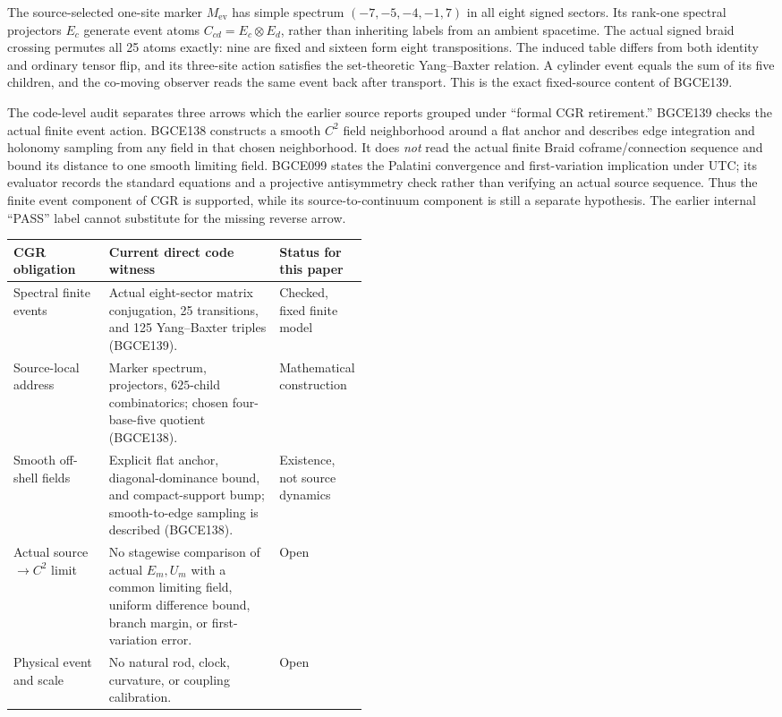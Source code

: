 \documentclass[11pt]{article}
\theoremstyle{definition}
\theoremstyle{remark}
\begin{document}
The source-selected one-site marker $M_{\mathrm{ev}}$ has simple spectrum $(-7,-5,-4,-1,7)$ in all eight signed sectors. Its rank-one spectral projectors $E_c$ generate event atoms $C_{cd}=E_c\otimes E_d$, rather than inheriting labels from an ambient spacetime. The actual signed braid crossing permutes all 25 atoms exactly: nine are fixed and sixteen form eight transpositions. The induced table differs from both identity and ordinary tensor flip, and its three-site action satisfies the set-theoretic Yang--Baxter relation. A cylinder event equals the sum of its five children, and the co-moving observer reads the same event back after transport. This is the exact fixed-source content of BGCE139.

The code-level audit separates three arrows which the earlier source reports grouped under ``formal CGR retirement.'' BGCE139 checks the actual finite event action. BGCE138 constructs a smooth $C^2$ field neighborhood around a flat anchor and describes edge integration and holonomy sampling from any field in that chosen neighborhood. It does \emph{not} read the actual finite Braid coframe/connection sequence and bound its distance to one smooth limiting field. BGCE099 states the Palatini convergence and first-variation implication under UTC; its evaluator records the standard equations and a projective antisymmetry check rather than verifying an actual source sequence. Thus the finite event component of CGR is supported, while its source-to-continuum component is still a separate hypothesis. The earlier internal ``PASS'' label cannot substitute for the missing reverse arrow.

\begin{center}
\small
\begin{tabularx}{0.96\linewidth}{>{\raggedright\arraybackslash}p{0.27\linewidth}X>{\raggedright\arraybackslash}p{0.19\linewidth}}
\toprule
CGR obligation & Current direct code witness & Status for this paper \\
\midrule
Spectral finite events & Actual eight-sector matrix conjugation, 25 transitions, and 125 Yang--Baxter triples (BGCE139). & Checked, fixed finite model \\
Source-local address & Marker spectrum, projectors, $625$-child combinatorics; chosen four-base-five quotient (BGCE138). & Mathematical construction \\
Smooth off-shell fields & Explicit flat anchor, diagonal-dominance bound, and compact-support bump; smooth-to-edge sampling is described (BGCE138). & Existence, not source dynamics \\
Actual source $\to C^2$ limit & No stagewise comparison of actual $E_m,U_m$ with a common limiting field, uniform difference bound, branch margin, or first-variation error. & Open \\
Physical event and scale & No natural rod, clock, curvature, or coupling calibration. & Open \\
\bottomrule
\end{tabularx}
\end{center}
\end{document}
